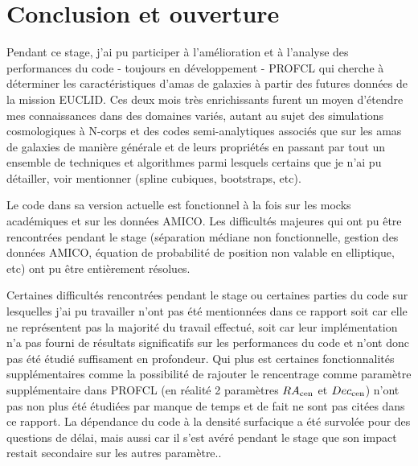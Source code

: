 \documentclass[a4paper,11pt]{article}
\numberwithin{equation}{section}
\begin{document}
    \newpage
    \section{Conclusion et ouverture}
      Pendant ce stage, j'ai pu participer à l'amélioration et à l'analyse des performances du code - toujours en développement - PROFCL qui cherche à déterminer les caractéristiques d'amas de galaxies à partir des futures données de la mission EUCLID. Ces deux mois très enrichissants furent un moyen d'étendre mes connaissances dans des domaines variés, autant au sujet des simulations cosmologiques à N-corps et des codes semi-analytiques associés que sur les amas de galaxies de manière générale et de leurs propriétés en passant par tout un ensemble de techniques et algorithmes parmi lesquels certains que je n'ai pu détailler, voir mentionner (spline cubiques, bootstraps, etc). \newline\par

      Le code dans sa version actuelle est fonctionnel à la fois sur les mocks académiques et sur les données AMICO. Les difficultés majeures qui ont pu être rencontrées pendant le stage (séparation médiane non fonctionnelle, gestion des données AMICO, équation de probabilité de position non valable en elliptique, etc) ont pu être entièrement résolues.\par
    Certaines difficultés rencontrées pendant le stage ou certaines parties du code sur lesquelles j'ai pu travailler n'ont pas été mentionnées dans ce rapport soit car elle ne représentent pas la majorité du travail effectué, soit car leur implémentation n'a pas fourni de résultats significatifs sur les performances du code et n'ont donc pas été étudié suffisament en profondeur. Qui plus est certaines fonctionnalités supplémentaires comme la possibilité de rajouter le rencentrage comme paramètre supplémentaire dans PROFCL (en réalité 2 paramètres $RA_{\rm{cen}}$ et $Dec_{\rm{cen}}$) n'ont pas non plus été étudiées par manque de temps et de fait ne sont pas citées dans ce rapport. La dépendance du code à la densité surfacique a été survolée pour des questions de délai, mais aussi car il s'est avéré pendant le stage que son impact restait secondaire sur les autres paramètre..\newline\par 
    
\end{document}
